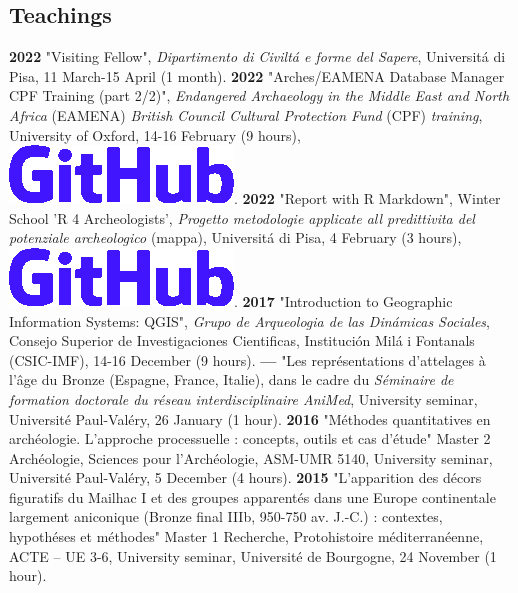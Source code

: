 \documentclass{article}
\begin{document}
\subsection*{Teachings}

\textbf{2022 }"Visiting Fellow", \textit{Dipartimento di Civilt\'{a} e forme del Sapere}, Universit\'{a} di Pisa, 11 March-15 April (1 month).
\smallbreak
\textbf{2022 }"Arches/EAMENA Database Manager CPF Training (part 2/2)", \textit{Endangered Archaeology in the Middle East and North Africa} (EAMENA) \textit{British Council Cultural Protection Fund} (CPF) \textit{training}, University of Oxford, 14-16 February (9 hours), \href{https://github.com/eamena-oxford/eamena-arches-dev/tree/main/training#readme}{\includegraphics[scale=0.1]{github-rect.png}}.
\smallbreak 
\textbf{2022 }"Report with R Markdown", Winter School 'R 4 Archeologists', \textit{Progetto metodologie applicate all predittivita del potenziale archeologico} (mappa), Universit\'{a} di Pisa, 4 February (3 hours), \href{https://github.com/zoometh/thomashuet/tree/main/profiles/oxford/R4A#readme}{\includegraphics[scale=0.1]{github-rect.png}}.
\smallbreak
\textbf{2017 }"Introduction to Geographic Information Systems: QGIS", \textit{Grupo de Arqueologia de las Din\'{a}micas Sociales}, Consejo Superior de Investigaciones Cientificas, Instituci\'{o}n Mil\'{a} i Fontanals (CSIC-IMF), 14-16 December (9 hours).
\smallbreak
\textbf{--- }"Les repr\'{e}sentations d'attelages \`{a} l'\^{a}ge du Bronze (Espagne, France, Italie), dans le cadre du \textit{S\'{e}minaire de formation doctorale du r\'{e}seau interdisciplinaire AniMed}, University seminar, Universit\'{e} Paul-Val\'{e}ry, 26 January (1 hour).
\smallbreak
\textbf{2016 }"M\'{e}thodes quantitatives en arch\'{e}ologie. L'approche processuelle : concepts, outils et cas d'\'{e}tude" Master 2 Arch\'{e}ologie, Sciences pour l'Arch\'{e}ologie, ASM-UMR 5140, University seminar, Universit\'{e} Paul-Val\'{e}ry, 5 December (4 hours).
\smallbreak
\textbf{2015 }"L'apparition des d\'{e}cors figuratifs du Mailhac I et des groupes apparent\'{e}s dans une Europe continentale largement aniconique (Bronze final IIIb, 950-750 av. J.-C.) : contextes, hypoth\'{e}ses et m\'{e}thodes" Master 1 Recherche, Protohistoire m\'{e}diterran\'{e}enne, ACTE -- UE 3-6, University seminar, Universit\'{e} de Bourgogne, 24 November (1 hour).
\end{document}
